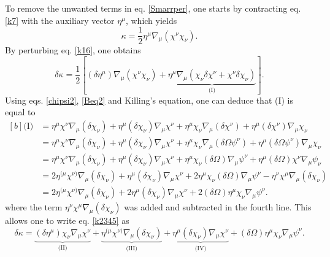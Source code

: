 \documentclass[
12pt,		%
openright,	%
twoside,  %
a4paper,			%
chapter=TITLE,		%
english,			%
french,				%
spanish,			%
brazil				%
]{USPSC-classe/USPSC}
\begin{document}
To remove the unwanted terms in eq. \ref{Smarrper}, one starts by contracting eq. \ref{k7} with the auxiliary vector $\eta^{\mu}$, which yields
\begin{equation}\label{k16}
    \kappa=\frac{1}{2}\eta^{\mu}\nabla_{\mu}(\chi^{\nu}\chi_{\nu}).
\end{equation}
By perturbing eq. \ref{k16}, one obtains
\begin{equation}\label{k2345}
    \delta\kappa=\frac{1}{2}[(\delta\eta^{\mu})\nabla_{\mu}(\chi^{\nu}\chi_{\nu})+\underbrace{\eta^{\mu}\nabla_{\mu}(\chi_{\nu}\delta\chi^{\nu}+\chi^{\nu}\delta\chi_{\nu})}_{\text{(I)}}].
\end{equation}
Using eqs. \ref{chipsi2}, \ref{Beq2} and Killing's equation, one can deduce that (I) is equal to
\begin{equation}
    \begin{aligned}[b]
    \text{(I)} & =\eta^{\mu}\chi^{\nu}\nabla_{\mu}(\delta\chi_{\nu})+\eta^{\mu}(\delta\chi_{\nu})\nabla_{\mu}\chi^{\nu}+\eta^{\mu}\chi_{\nu}\nabla_{\mu}(\delta\chi^{\nu})+\eta^{\mu}(\delta\chi^{\nu})\nabla_{\mu}\chi_{\nu} \\
    & = \eta^{\mu}\chi^{\nu}\nabla_{\mu}(\delta\chi_{\nu})+\eta^{\mu}(\delta\chi_{\nu})\nabla_{\mu}\chi^{\nu}+\eta^{\mu}\chi_{\nu}\nabla_{\mu}(\delta\Omega\psi^{\nu})+\eta^{\mu}(\delta\Omega\psi^{\nu})\nabla_{\mu}\chi_{\nu}\\
    &= \eta^{\mu}\chi^{\nu}\nabla_{\mu}(\delta\chi_{\nu})+\eta^{\mu}(\delta\chi_{\nu})\nabla_{\mu}\chi^{\nu}+\eta^{\mu}\chi_{\nu}(\delta\Omega)\nabla_{\mu}\psi^{\nu}+\eta^{\mu}(\delta\Omega)\chi^{\nu}\nabla_{\mu}\psi_{\nu}\\
    &= 2\eta^{(\mu}\chi^{\nu)}\nabla_{\mu}(\delta\chi_{\nu})+\eta^{\mu}(\delta\chi_{\nu})\nabla_{\mu}\chi^{\nu}+2\eta^{\mu}\chi_{\nu}(\delta\Omega)\nabla_{\mu}\psi^{\nu}-\eta^{\nu}\chi^{\mu}\nabla_{\mu}(\delta\chi_{\nu})\\
    &= 2\eta^{(\mu}\chi^{\nu)}\nabla_{\mu}(\delta\chi_{\nu})+2\eta^{\mu}(\delta\chi_{\nu})\nabla_{\mu}\chi^{\nu}+2(\delta\Omega)\eta^{\mu}\chi_{\nu}\nabla_{\mu}\psi^{\nu}.
    \end{aligned}
\end{equation}
where the term $\eta^{\nu}\chi^{\mu}\nabla_{\mu}(\delta\chi_{\nu})$ was added and subtracted in the fourth line. This allows one to write eq. \ref{k2345} as
\begin{equation}\label{k17}
    \delta\kappa=\underbrace{(\delta\eta^{\mu})\chi_{\nu}\nabla_{\mu}\chi^{\nu}}_{\text{(II)}}+\underbrace{\eta^{(\mu}\chi^{\nu)}\nabla_{\mu}(\delta\chi_{\nu})}_{\text{(III)}}+\underbrace{\eta^{\mu}(\delta\chi_{\nu})\nabla_{\mu}\chi^{\nu}}_{\text{(IV)}}+(\delta\Omega)\eta^{\mu}\chi_{\nu}\nabla_{\mu}\psi^{\nu}.
\end{equation}
\end{document}
